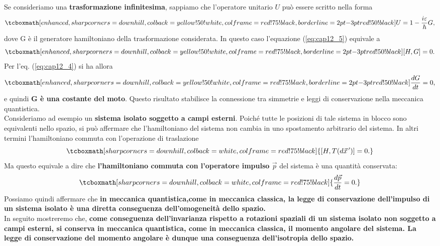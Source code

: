 Se consideriamo una \textbf{trasformazione infinitesima}, sappiamo che l'operatore unitario ${U}$ può essere scritto nella forma 
	\begin{equation}
		\tcboxmath[enhanced, sharp corners=downhill, colback=yellow!50!white, colframe=red!75!black, borderline={2pt}{-3pt}{red!50!black}]{
			{U}= 1- \frac{i\varepsilon}{\hbar}G,
			}
	\end{equation}
dove G è il generatore hamiltoniano della trasformazione considerata. In questo caso l'equazione (\ref{eq:cap12_5}) equivale a 
	\begin{equation} 
		\tcboxmath[enhanced, sharp corners=downhill, colback=yellow!50!white, colframe=red!75!black, borderline={2pt}{-3pt}{red!50!black}]{
			[H,G]=0.
			}
	\end{equation}
Per l'eq. (\ref{eq:cap12_4}) si ha allora
	\begin{equation}
		\tcboxmath[enhanced, sharp corners=downhill, colback=yellow!50!white, colframe=red!75!black, borderline={2pt}{-3pt}{red!50!black}]{
			\frac{dG}{dt}=0,
			}
	\end{equation}
e quindi \textbf{G è una costante del moto}. Questo risultato stabilisce la connessione tra simmetrie e leggi di conservazione nella meccanica quantistica.\\

Consideriamo ad esempio un \textbf{sistema isolato soggetto a campi esterni}. Poiché tutte le posizioni di tale sistema in blocco sono equivalenti nello spazio, si può affermare che l'hamiltoniano del sistema non cambia in uno spostamento arbitrario del sistema. In altri termini l'hamiltoniano commuta con l'operazione di traslazione
	\begin{equation}
		\tcboxmath[sharp corners=downhill, colback=white, colframe=red!75!black]{
			[H,T (d\vec{x}^{\, \prime})]=0.
			}
\end{equation}
Ma questo equivale a dire che \textbf{l'hamiltoniano commuta con l'operatore impulso $\vec{p}$} del sistema è una quantità conservata:
	\begin{equation}
		\tcboxmath[sharp corners=downhill, colback=white, colframe=red!75!black]{
			\frac{d\vec{p}}{dt}=0.
			}
	\end{equation}
Possiamo quindi affermare che \textbf{in meccanica quantistica,come in meccanica classica, la legge di conservazione dell'impulso di un sistema isolato è una diretta conseguenza dell'omogeneità dello spazio.}\\

In seguito mostreremo che, \textbf{come conseguenza dell'invarianza rispetto a rotazioni spaziali di un sistema isolato non soggetto a campi esterni, si conserva in meccanica quantistica, come in meccanica classica, il momento angolare del sistema. La legge di conservazione del momento angolare è dunque una conseguenza dell'isotropia dello spazio.}\\

